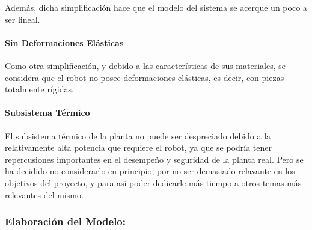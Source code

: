 \documentclass{article}
\begin{document}
\begin{sloppypar}
Además, dicha simplificación hace que el modelo del sistema se acerque un poco a ser lineal.

\paragraph{Sin Deformaciones Elásticas}
\label{sec:Sin Deformaciones Elásticas}
\hfill

Como otra simplificación, y debido a las características de sus materiales, se considera que el robot no posee deformaciones elásticas, es decir, con piezas totalmente rígidas.


\paragraph{Subsistema Térmico}
\label{sec:Subsistema Térmico}
\hfill

\hfill

El subsistema térmico de la planta no puede ser despreciado debido a la relativamente alta potencia que requiere el robot, ya que se podría tener repercusiones importantes en el desempeño y seguridad de la planta real. Pero se ha decidido no considerarlo en principio, por no ser demasiado relavante en los objetivos del proyecto, y para así poder dedicarle más tiempo a otros temas más relevantes del mismo.






\subsubsection{Elaboración del Modelo:}
\label{sec:Elaboración del Modelo:}


\end{sloppypar}
\end{document}
